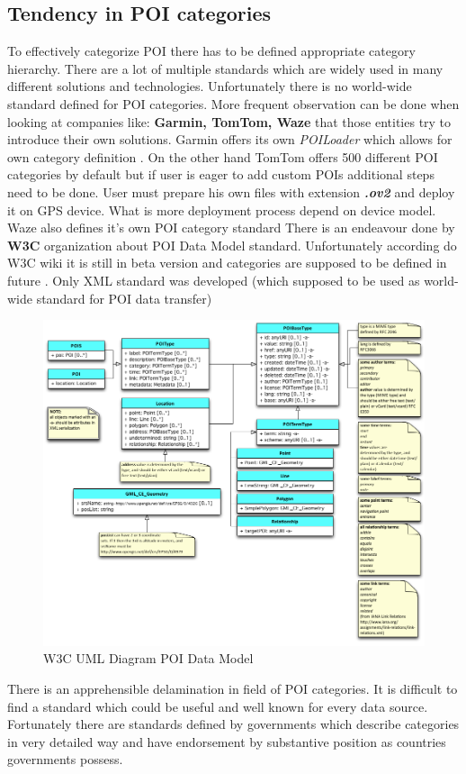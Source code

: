 \subsection{Tendency in POI categories}
To effectively categorize POI there has to be defined appropriate category hierarchy. There are a lot of multiple standards which are widely used in many different solutions and technologies. Unfortunately there is no world-wide standard defined for POI categories. More frequent observation can be done when looking at companies like: \textbf{Garmin, TomTom, Waze} that those entities try to introduce their own solutions. Garmin offers its own \textit{POILoader} which allows for own category definition \cite{9}. On the other hand TomTom offers 500 different POI categories by default \cite{10} but if user is eager to add custom POIs additional steps need to be done. User must prepare his own files with extension \textbf{\textit{.ov2}} and deploy it on GPS device. What is more deployment process depend on device model. Waze also defines it's own POI category standard \cite{14} There is an endeavour done by \textbf{W3C} organization about POI Data Model standard. Unfortunately according do W3C wiki it is still in beta version and categories are supposed to be defined in future \cite{12}. Only XML standard was developed (which supposed to be used as world-wide standard for POI data transfer) \cite{13}
\begin{figure}
	\centering
	\includegraphics[scale=0.5]{W3c_poi_model.png}
	\caption{W3C UML Diagram POI Data Model}
	\label{fig:@=w3cDataModel}
\end{figure}
There is an apprehensible delamination in field of POI categories. It is difficult to find a standard which could be useful and well known for every data source. Fortunately there are standards defined by governments which describe categories in very detailed way and have endorsement by substantive position as countries governments possess. 
